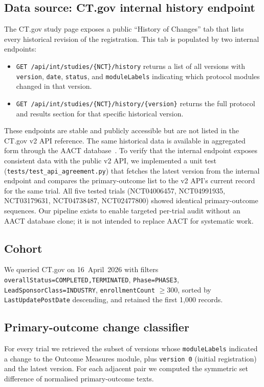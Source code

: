 \documentclass[11pt,a4paper]{article}
\begin{document}
\subsection{Data source: CT.gov internal history endpoint}
The CT.gov study page exposes a public ``History of Changes'' tab that
lists every historical revision of the registration. This tab is
populated by two internal endpoints:
\begin{itemize}\setlength\itemsep{0.2em}
    \item \texttt{GET /api/int/studies/\{NCT\}/history} returns a list
          of all versions with \texttt{version}, \texttt{date},
          \texttt{status}, and \texttt{moduleLabels} indicating which
          protocol modules changed in that version.
    \item \texttt{GET /api/int/studies/\{NCT\}/history/\{version\}}
          returns the full protocol and results section for that
          specific historical version.
\end{itemize}
These endpoints are stable and publicly accessible but are not listed
in the CT.gov v2 API reference. The same historical data is available
in aggregated form through the AACT database~\cite{aact}. To verify
that the internal endpoint exposes consistent data with the public
v2 API, we implemented a unit test
(\texttt{tests/test\_api\_agreement.py}) that fetches the latest
version from the internal endpoint and compares the primary-outcome
list to the v2 API's current record for the same trial. All five
tested trials (NCT04006457, NCT04991935, NCT03179631, NCT04738487,
NCT02477800) showed identical primary-outcome sequences. Our
pipeline exists to enable targeted per-trial audit without an AACT
database clone; it is not intended to replace AACT for systematic
work.

\subsection{Cohort}
We queried CT.gov on 16~April~2026 with filters
\texttt{overallStatus=COMPLETED,TERMINATED},
\texttt{Phase=PHASE3}, \texttt{LeadSponsorClass=INDUSTRY},
\texttt{enrollmentCount} $\geq 300$, sorted by
\texttt{LastUpdatePostDate} descending, and retained the first
1{,}000 records.

\subsection{Primary-outcome change classifier}
For every trial we retrieved the subset of versions whose
\texttt{moduleLabels} indicated a change to the Outcome Measures
module, plus \texttt{version 0} (initial registration) and the latest
version. For each adjacent pair we computed the symmetric set
difference of normalised primary-outcome texts.
\end{document}
